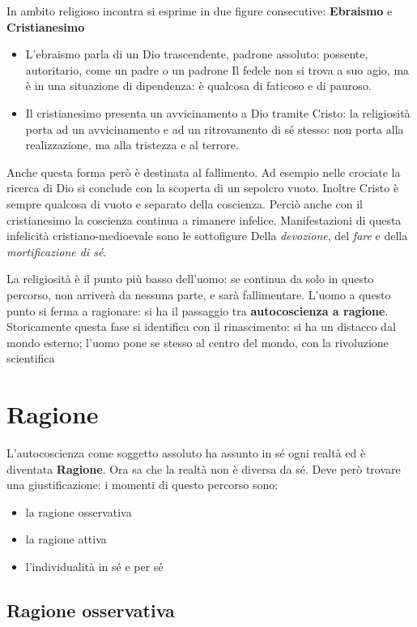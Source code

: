 \documentclass[a4paper, twoside, titlepage]{book}
\begin{document}
In ambito religioso incontra si esprime in due figure consecutive: \textbf{Ebraismo} e \textbf{Cristianesimo}
\begin{itemize}
\item L'ebraismo parla di un Dio trascendente, padrone assoluto: possente, autoritario, come un padre o un padrone
Il fedele non si trova a suo agio, ma è in una situazione di dipendenza: è qualcosa di faticoso e di pauroso.
\item Il cristianesimo presenta un avvicinamento a Dio tramite Cristo: la religiosità porta ad un avvicinamento e ad un ritrovamento di sé stesso: non porta alla realizzazione, ma alla tristezza e al terrore.
\end{itemize}

Anche questa forma però è destinata al fallimento. Ad esempio nelle crociate la ricerca di Dio si conclude con la scoperta di un sepolcro vuoto.
Inoltre Cristo è sempre qualcosa di vuoto e separato della coscienza.
Perciò anche con il cristianesimo la coscienza continua a rimanere infelice.
Manifestazioni di questa infelicità cristiano-medioevale sono le sottofigure
Della \textit{devozione}, del \textit{fare} e della \textit{mortificazione di sé}.

La religiosità è il punto più basso dell'uomo: se continua da solo in questo percorso, non arriverà da nessuna parte, e sarà fallimentare. L'uomo a questo punto si ferma a ragionare: si ha il passaggio tra \textbf{autocoscienza a ragione}.
Storicamente questa fase si identifica con il rinascimento: si ha un distacco dal mondo esterno; l'uomo pone se stesso al centro del mondo, con la rivoluzione scientifica

\section{Ragione}

L'autocoscienza come soggetto assoluto ha assunto in sé ogni realtà ed è diventata \textbf{Ragione}. Ora sa che la realtà non è diversa da sé. Deve però trovare una giustificazione: i momenti di questo percorso sono:
\begin{itemize}
\item la ragione osservativa
\item la ragione attiva
\item l'individualità in sé e per sé
\end{itemize}

\subsection{Ragione osservativa}
\end{document}
